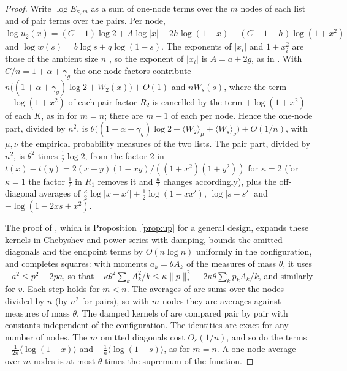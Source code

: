 \documentclass[11pt]{article}
\theoremstyle{definition}
\begin{document}
\begin{proof}
Write $\log E_{\kappa,m}$ as a sum of one-node terms over the $m$ nodes of each list and of pair terms over the pairs. Per node, $\log u_2(x)=(C-1)\log2+A\log|x|+2h\log(1-x)-(C-1+h)\log(1+x^2)$ and $\log w(s)=b\log s+q\log(1-s)$. The exponents of $|x_i|$ and $1+x_i^2$ are those of the ambient size $n$ \cite[Eq.~(5.8)]{Jha}, so the exponent of $|x_i|$ is $A=a+2g$, as in \cite[Eq.~(80)]{OAI}. With $C/n=1+\alpha+\gamma_g$ the one-node factors contribute $n\big((1+\alpha+\gamma_g)\log2+W_2(x)\big)+O(1)$ and $nW_s(s)$, where the term $-\log(1+x^2)$ of each pair factor $R_2$ is cancelled by the term $+\log(1+x^2)$ of each $K$, as in \cite[Eq.~(5.8)]{Jha} for $m=n$; there are $m-1$ of each per node. Hence the one-node part, divided by $n^2$, is $\theta\big((1+\alpha+\gamma_g)\log2+\langle W_2\rangle_\mu+\langle W_s\rangle_\nu\big)+O(1/n)$, with $\mu,\nu$ the empirical probability measures of the two lists. The pair part, divided by $n^2$, is $\theta^2$ times $\frac12\log2$, from the factor $2$ in $t(x)-t(y)=2(x-y)(1-xy)/((1+x^2)(1+y^2))$ for $\kappa=2$ (for $\kappa=1$ the factor $\frac12$ in $R_1$ removes it and $\frac\kappa2$ changes accordingly), plus the off-diagonal averages of $\frac\kappa2\log|x-x'|+\frac12\log(1-xx')$, $\log|s-s'|$ and $-\log(1-2xs+x^2)$.

The proof of \cite[Prop.~6.1]{OAI}, which is Proposition~\ref{prop:up} for a general design, expands these kernels in Chebyshev and power series with damping, bounds the omitted diagonals and the endpoint terms by $O(n\log n)$ uniformly in the configuration, and completes squares: with moments $a_k=\theta A_k$ of the measures of mass $\theta$, it uses $-a^2\le p^2-2pa$, so that $-\kappa\theta^2\sum_kA_k^2/k\le\kappa\|p\|_*^2-2\kappa\theta\sum_kp_kA_k/k$, and similarly for $v$. Each step holds for $m<n$. The averages of \cite[Eq.~(80)]{OAI} are sums over the nodes divided by $n$ (by $n^2$ for pairs), so with $m$ nodes they are averages against measures of mass $\theta$. The damped kernels of \cite[Eqs.~(83)--(85)]{OAI} are compared pair by pair with constants independent of the configuration. The identities \cite[Eqs.~(86), (87)]{OAI} are exact for any number of nodes. The $m$ omitted diagonals cost $O_\varepsilon(1/n)$, and so do the terms $-\frac1{2n}\langle\log(1-x)\rangle$ and $-\frac1n\langle\log(1-s)\rangle$, as for $m=n$. A one-node average over $m$ nodes is at most $\theta$ times the supremum of the function.


\end{proof}
\end{document}
